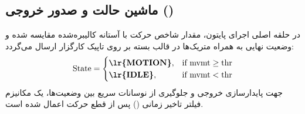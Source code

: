 \documentclass[12pt,a4paper]{article}
\begin{document}
\subsection{ماشین حالت و صدور خروجی ()}
در حلقه اصلی اجرای پایتون، مقدار شاخص حرکت با آستانه کالیبره‌شده مقایسه شده و وضعیت نهایی به همراه متریک‌ها در قالب بسته  بر روی تاپیک کارگزار  ارسال می‌گردد:
\begin{equation}
\text{State} = 
\begin{cases} 
\textbf{\lr{MOTION}}, & \text{if } \text{mvmt} \ge \text{thr} \\
\textbf{\lr{IDLE}},   & \text{if } \text{mvmt} < \text{thr}
\end{cases}
\end{equation}
جهت پایدارسازی خروجی و جلوگیری از نوسانات سریع بین وضعیت‌ها، یک مکانیزم فیلتر تاخیر زمانی () پس از قطع حرکت اعمال شده است.
\end{document}
